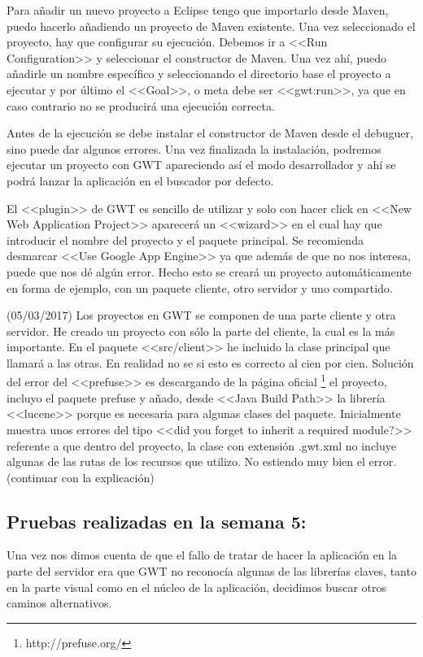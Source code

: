 Para añadir un nuevo proyecto a Eclipse tengo que importarlo desde Maven, puedo hacerlo añadiendo un proyecto de Maven existente. Una vez seleccionado el proyecto, hay que configurar su ejecución. Debemos ir a <<Run Configuration>> y seleccionar el constructor de Maven. Una vez ahí, puedo añadirle un nombre específico y seleccionando el directorio base el proyecto a ejecutar y por último el <<Goal>>, o meta debe ser <<gwt:run>>, ya que en caso contrario no se producirá una ejecución correcta.

Antes de la ejecución se debe instalar el constructor de Maven desde el debuguer, sino puede dar algunos errores. Una vez finalizada la instalación, podremos ejecutar un proyecto con GWT apareciendo así el modo desarrollador y ahí se podrá lanzar la aplicación en el buscador por defecto.

El <<plugin>> de GWT es sencillo de utilizar y solo con hacer click en <<New Web Application Project>> aparecerá un <<wizard>> en el cual hay que introducir el nombre del proyecto y el paquete principal. Se recomienda desmarcar <<Use Google App Engine>> ya que además de que no nos interesa, puede que nos dé algún error. Hecho esto se creará un proyecto automáticamente en forma de ejemplo, con un paquete cliente, otro servidor y uno compartido.


(05/03/2017)
Los proyectos en GWT se componen de una parte cliente y otra servidor. He creado un proyecto con sólo la parte del cliente, la cual es la más importante. En el paquete <<src/client>> he incluido la clase principal que llamará a las otras. En realidad no se si esto es correcto al cien por cien.
Solución del error del  <<prefuse>> es descargando de la página oficial \footnote{http://prefuse.org/} el proyecto, incluyo el paquete prefuse y añado, desde <<Java Build Path>> la librería  <<lucene>> porque es necesaria para algunas clases del paquete. Inicialmente muestra unos errores del tipo <<did you forget to inherit a required module?>> referente a que dentro del proyecto, la clase con extensión .gwt.xml no incluye algunas de las rutas de los recursos que utilizo. No estiendo muy bien el error. (continuar con la explicación)

\subsection{Pruebas realizadas en la semana 5:}

Una vez nos dimos cuenta de que el fallo de tratar de hacer la aplicación en la parte del servidor era que GWT no reconocía algunas de las librerías claves, tanto en la parte visual como en el núcleo de la aplicación, decidimos buscar otros caminos alternativos. 

